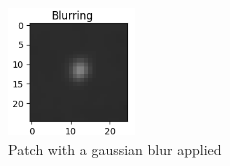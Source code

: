 \documentclass[
a4paper,     %
10pt         %
]{scrartcl}  %
\begin{document}
\begin{figure}[h]
    \center
    \includegraphics[width=0.3\textwidth]{figures/augment_blur}
    \caption{Patch with a gaussian blur applied}\label{fig:aug5}
\end{figure}



\end{document}
